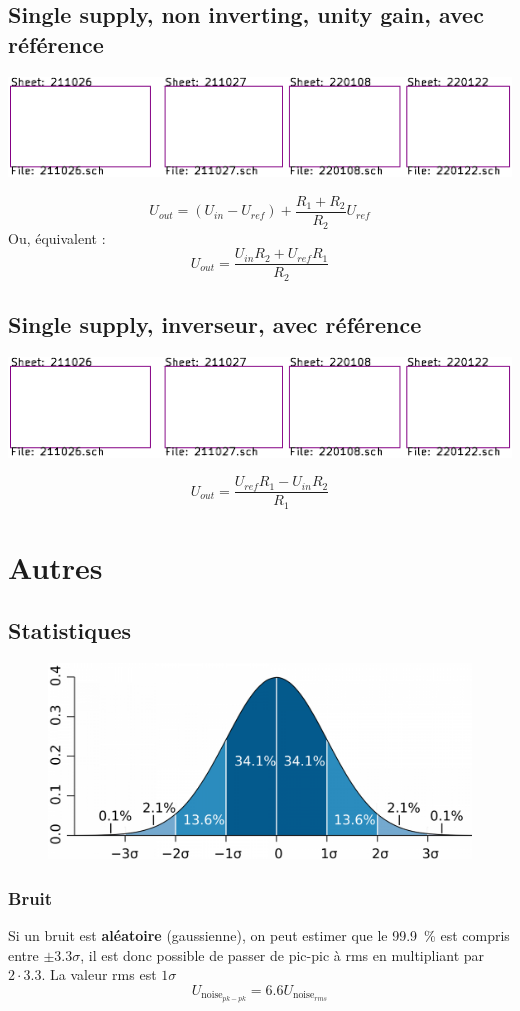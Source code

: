 \documentclass[resume]{subfiles}
\begin{document}
\begin{multicols}{3}
\subsection{Single supply, non inverting, unity gain, avec référence}
\begin{center}
\includegraphics[scale=1,page=3]{../KiCad/resume-crop.pdf}
\end{center}
$$\boxed{U_{out}=\left(U_{in}-U_{ref}\right)+\frac{R_1+R_2}{R_2}U_{ref}}$$
Ou, équivalent :
$$\boxed{U_{out}=\frac{U_{in}R_2+U_{ref}R_1}{R_2}}$$
\subsection{Single supply, inverseur, avec référence}
\begin{center}
\includegraphics[scale=1,page=4]{../KiCad/resume-crop.pdf}
\end{center}
$$\boxed{U_{out}=\frac{U_{ref}R_1-U_{in}R_2}{R_1}}$$
\section{Autres}
\subsection{Statistiques}
\begin{figure}[H]
\centering
\includegraphics[width=0.6\columnwidth]{gauss.png}
\end{figure}
\subsubsection{Bruit}
Si un bruit est \textbf{aléatoire} (gaussienne), on peut estimer que le \SI{99.9}{\percent} est compris entre $\pm 3.3\sigma$, il est donc possible de passer de pic-pic à rms en multipliant par $2\cdot 3.3$. La valeur rms est $1\sigma$
$$U_{\text{noise}_{pk-pk}}=6.6 U_{\text{noise}_{rms}}$$
\end{multicols}
\end{document}
